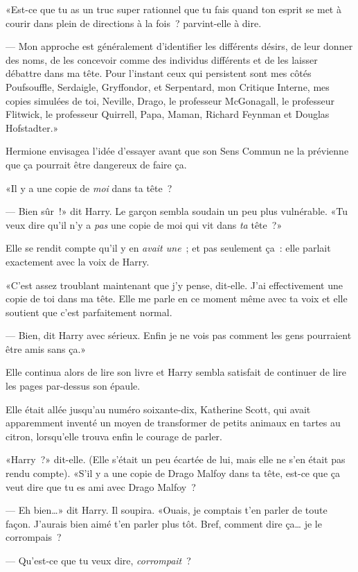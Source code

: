 «Est-ce que tu as un truc super rationnel que tu fais quand ton esprit se met à courir dans plein de directions à la fois~? parvint-elle à dire.

--- Mon approche est généralement d'identifier les différents désirs, de leur donner des noms, de les concevoir comme des individus différents et de les laisser débattre dans ma tête. Pour l'instant ceux qui persistent sont mes côtés Poufsouffle, Serdaigle, Gryffondor, et Serpentard, mon Critique Interne, mes copies simulées de toi, Neville, Drago, le professeur McGonagall, le professeur Flitwick, le professeur Quirrell, Papa, Maman, Richard Feynman et Douglas Hofstadter.»

Hermione envisagea l'idée d'essayer avant que son Sens Commun ne la prévienne que ça pourrait être dangereux de faire ça.

«Il y a une copie de \emph{moi} dans ta tête~?

--- Bien sûr~!» dit Harry. Le garçon sembla soudain un peu plus vulnérable. «Tu veux dire qu'il n'y a \emph{pas} une copie de moi qui vit dans \emph{ta} tête~?»

Elle se rendit compte qu'il y en \emph{avait une}~; et pas seulement ça~: elle parlait exactement avec la voix de Harry.

«C'est assez troublant maintenant que j'y pense, dit-elle. J'ai effectivement une copie de toi dans ma tête. Elle me parle en ce moment même avec ta voix et elle soutient que c'est parfaitement normal.

--- Bien, dit Harry avec sérieux. Enfin je ne vois pas comment les gens pourraient être amis sans ça.»

Elle continua alors de lire son livre et Harry sembla satisfait de continuer de lire les pages par-dessus son épaule.

Elle était allée jusqu'au numéro soixante-dix, Katherine Scott, qui avait apparemment inventé un moyen de transformer de petits animaux en tartes au citron, lorsqu'elle trouva enfin le courage de parler.

«Harry~?» dit-elle. (Elle s'était un peu écartée de lui, mais elle ne s'en était pas rendu compte). «S'il y a une copie de Drago Malfoy dans ta tête, est-ce que ça veut dire que tu es ami avec Drago Malfoy~?

--- Eh bien…» dit Harry. Il soupira. «Ouais, je comptais t'en parler de toute façon. J'aurais bien aimé t'en parler plus tôt. Bref, comment dire ça… je le corrompais~?

--- Qu'est-ce que tu veux dire, \emph{corrompait}~?

